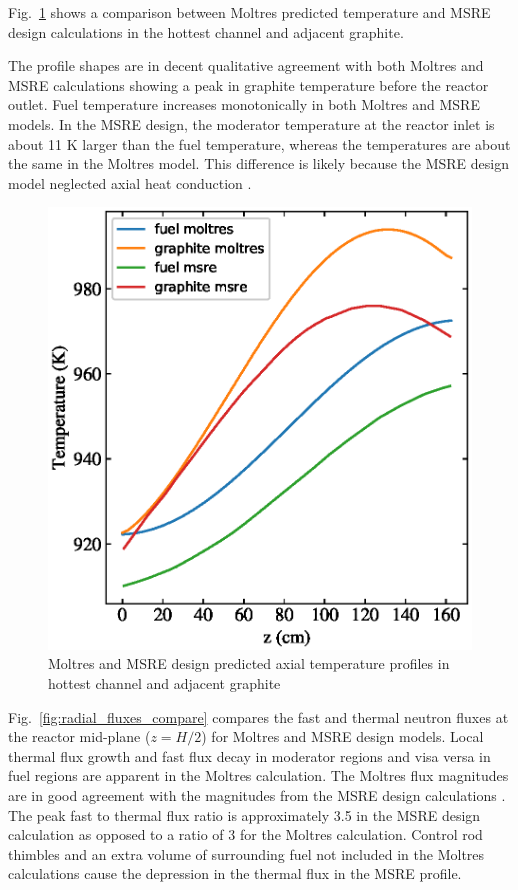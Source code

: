 \documentclass{anstrans}
\begin{document}
Fig.~\ref{fig:temp_compare} shows a comparison between Moltres predicted temperature and \gls{MSRE} design calculations
\cite{briggs_molten-salt_1964} in the hottest channel and adjacent graphite.

The profile shapes are in decent qualitative agreement with both Moltres and
\gls{MSRE} calculations showing a peak in graphite temperature before the
reactor outlet. Fuel temperature increases monotonically in both Moltres and
\gls{MSRE} models. In the \gls{MSRE} design, the moderator
temperature at the reactor inlet is about 11 K larger than the
fuel temperature, whereas the temperatures are about the same in the Moltres
model. This difference is likely because the \gls{MSRE} design model
neglected axial heat conduction \cite[p. 99]{briggs_molten-salt_1964}.

\begin{figure}[htpb]
    \centering
    \includegraphics[width=\linewidth]{combined_msre_moltres_axial_temps.eps}
    \caption{Moltres and \gls{MSRE} design
      \cite[p. 99]{briggs_molten-salt_1964} predicted axial temperature profiles in hottest channel
      and adjacent graphite}
    \label{fig:temp_compare}
\end{figure}

Fig.~\ref{fig:radial_fluxes_compare} compares the fast and thermal neutron fluxes at
the reactor mid-plane ($z=H/2$) for Moltres and \gls{MSRE} design models. Local
thermal flux growth and fast flux decay in moderator regions and visa versa in
fuel regions are apparent in the Moltres calculation. The Moltres flux
magnitudes are in good agreement with the magnitudes from the \gls{MSRE} design
calculations \cite[p. 92]{briggs_molten-salt_1964}. The peak fast to thermal
flux ratio is approximately 3.5 in the \gls{MSRE} design calculation as opposed
to a ratio of 3 for the Moltres calculation. Control rod thimbles and an extra
volume of surrounding fuel not included in the Moltres calculations cause the
depression in the thermal flux in the \gls{MSRE} profile.
\end{document}
